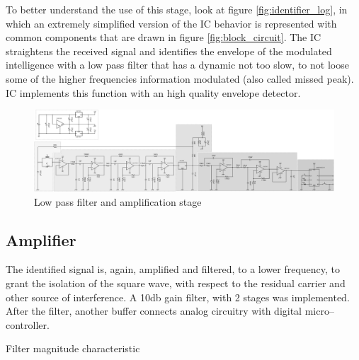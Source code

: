 To better understand the use of this stage, look at figure \ref{fig:identifier_log}, in which an extremely simplified version of the IC behavior is represented with common components that are drawn in figure \ref{fig:block_circuit}. The IC straightens the received signal and identifies the envelope of the modulated intelligence with a low pass filter that has a dynamic not too slow, to not loose some of the higher frequencies information modulated (also called missed peak). IC implements this function with an high quality envelope detector.
\begin{figure}[h]
	\centering
	\includegraphics*[viewport=1443 3 2320 350,scale=0.4]{ch2/img/receiver3.pdf}
	\caption{Low pass filter and amplification stage}
	\label{fig:filter2}
	\forcerectofloat
\end{figure}

\subsection{Amplifier}

The identified signal is, again, amplified and filtered, to a lower frequency, to grant the isolation of the square wave, with respect to the residual carrier and other source of interference. A \num{10}\si{\decibel} gain filter, with 2 stages was implemented. After the filter, another buffer connects analog circuitry with digital micro--controller.
\begin{marginfigure}[5cm]
	\centering
	\caption{Filter magnitude characteristic}
\end{marginfigure}

